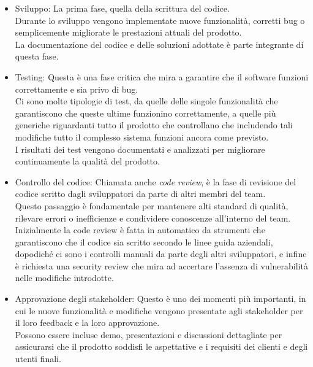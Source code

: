 \begin{itemize}
  \item Sviluppo: La prima fase, quella della scrittura del codice.\\ Durante lo
    sviluppo vengono implementate nuove funzionalità, corretti bug o
    semplicemente migliorate le prestazioni attuali del prodotto.\\ La
    documentazione del codice e delle soluzioni adottate è parte integrante di
    questa fase.

  \item Testing: Questa è una fase critica che mira a garantire che il software
    funzioni correttamente e sia privo di bug.\\ Ci sono molte tipologie di test,
    da quelle delle singole funzionalità che garantiscono che queste ultime funzionino
    correttamente, a quelle più generiche riguardanti tutto il prodotto che
    controllano che includendo tali modifiche tutto il complesso sistema
    funzioni ancora come previsto.\\ I risultati dei test vengono documentati e
    analizzati per migliorare continuamente la qualità del prodotto.

  \item Controllo del codice: Chiamata anche \textit{code review}, è la fase di
    revisione del codice scritto dagli sviluppatori da parte di altri membri del
    team.\\ Questo passaggio è fondamentale per mantenere alti standard di
    qualità, rilevare errori o inefficienze e condividere conoscenze all'interno
    del team.\\ Inizialmente la code review è fatta in automatico da strumenti che
    garantiscono che il codice sia scritto secondo le linee guida aziendali,
    dopodiché ci sono i controlli manuali da parte degli altri sviluppatori, e infine
    è richiesta una security review che mira ad accertare l'assenza di vulnerabilità
    nelle modifiche introdotte.

  \item Approvazione degli stakeholder: Questo è uno dei momenti più importanti,
    in cui le nuove funzionalità e modifiche vengono presentate agli stakeholder
    per il loro feedback e la loro approvazione.\\ Possono essere incluse demo,
    presentazioni e discussioni dettagliate per assicurarsi che il prodotto
    soddisfi le aspettative e i requisiti dei clienti e degli utenti finali.


\end{itemize}
